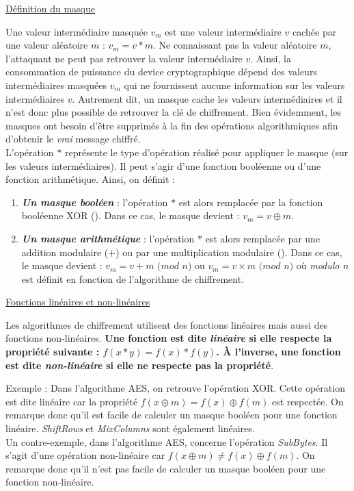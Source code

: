 \documentclass[10pt, oneside, a4paper]{article}
\begin{document}
\underline{Définition du masque}

Une valeur intermédiaire masquée $v_m$ est une valeur intermédiaire $v$ cachée par une valeur aléatoire $m$ : $v_m = v * m$. Ne connaissant pas la valeur aléatoire $m$, l'attaquant ne peut pas retrouver la valeur intermédiaire $v$. Ainsi, la consommation de puissance du device cryptographique dépend des valeurs intermédiaires masquées $v_m$ qui ne fournissent aucune information sur les valeurs intermédiaires $v$. Autrement dit, un masque cache les valeurs intermédiaires et il n'est donc plus possible de retrouver la clé de chiffrement. Bien évidemment, les masques ont besoin d'être supprimés à la fin des opérations algorithmiques afin d'obtenir le \textit{vrai} message chiffré. \\
L'opération $*$ représente le type d'opération réalisé pour appliquer le masque (sur les valeurs intermédiaires). Il peut s'agir d'une fonction booléenne ou d'une fonction arithmétique. Ainsi, on définit : 
\begin{enumerate}
\item \textbf{\textit{Un masque booléen}} : l'opération $*$ est alors remplacée par la fonction booléenne XOR (\oplus). Dans ce cas, le masque devient : $v_m = v \oplus m$.
\item \textbf{\textit{Un masque arithmétique}} : l'opération $*$ est alors remplacée par une addition modulaire ($+$) ou par une multiplication modulaire (\times ). Dans ce cas, le masque devient : $v_m = v + m$ $(mod$ $n)$ ou $v_m = v \times m$ $(mod$ $n)$ où \textit{modulo n} est définit en fonction de l'algorithme de chiffrement.
\end{enumerate}

\newpage

\underline{Fonctions linéaires et non-linéaires}

Les algorithmes de chiffrement utilisent des fonctions linéaires mais aussi des fonctions non-linéaires. \textbf{Une fonction est dite \textit{linéaire} si elle respecte la propriété suivante : $f(x*y) = f(x)*f(y)$. À l'inverse, une fonction est dite \textit{non-linéaire} si elle ne respecte pas la propriété}.

\hspace{-0.5 cm} Exemple : Dans l'algorithme AES, on retrouve l'opération XOR. Cette opération est dite linéaire car la propriété $f(x\oplus m) = f(x) \oplus f(m)$ est respectée. On remarque donc qu'il est facile de calculer un masque booléen pour une fonction linéaire. \textit{ShiftRows} et \textit{MixColumns} sont également linéaires. \\
Un contre-exemple, dans l'algorithme AES, concerne l'opération \textit{SubBytes}. Il s'agit d'une opération non-linéaire car $f(x\oplus m) \neq f(x) \oplus f(m)$. On remarque donc qu'il n'est pas facile de calculer un masque booléen pour une fonction non-linéaire. 
\end{document}
